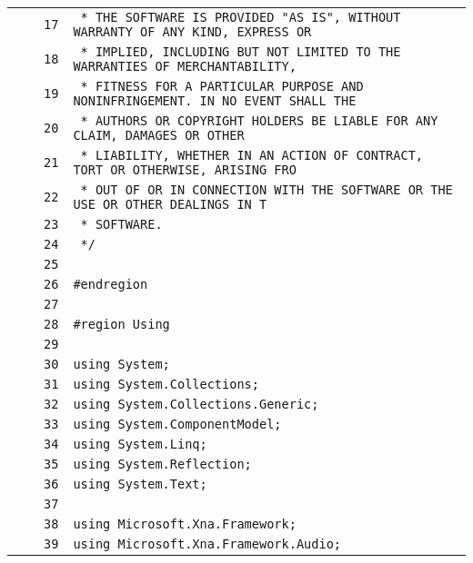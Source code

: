 \documentclass[a4paper,10pt]{article}
\begin{document}
\begin{longtable}[l]{lrrl}
\cellcolor{gray} &  & \verb~17~ & \verb~ * THE SOFTWARE IS PROVIDED "AS IS", WITHOUT WARRANTY OF ANY KIND, EXPRESS OR~\\
\cellcolor{gray} &  & \verb~18~ & \verb~ * IMPLIED, INCLUDING BUT NOT LIMITED TO THE WARRANTIES OF MERCHANTABILITY,~\\
\cellcolor{gray} &  & \verb~19~ & \verb~ * FITNESS FOR A PARTICULAR PURPOSE AND NONINFRINGEMENT. IN NO EVENT SHALL THE~\\
\cellcolor{gray} &  & \verb~20~ & \verb~ * AUTHORS OR COPYRIGHT HOLDERS BE LIABLE FOR ANY CLAIM, DAMAGES OR OTHER~\\
\cellcolor{gray} &  & \verb~21~ & \verb~ * LIABILITY, WHETHER IN AN ACTION OF CONTRACT, TORT OR OTHERWISE, ARISING FRO~\\
\cellcolor{gray} &  & \verb~22~ & \verb~ * OUT OF OR IN CONNECTION WITH THE SOFTWARE OR THE USE OR OTHER DEALINGS IN T~\\
\cellcolor{gray} &  & \verb~23~ & \verb~ * SOFTWARE.~\\
\cellcolor{gray} &  & \verb~24~ & \verb~ */~\\
\cellcolor{gray} &  & \verb~25~ & \verb~~\\
\cellcolor{gray} &  & \verb~26~ & \verb~#endregion~\\
\cellcolor{gray} &  & \verb~27~ & \verb~~\\
\cellcolor{gray} &  & \verb~28~ & \verb~#region Using~\\
\cellcolor{gray} &  & \verb~29~ & \verb~~\\
\cellcolor{gray} &  & \verb~30~ & \verb~using System;~\\
\cellcolor{gray} &  & \verb~31~ & \verb~using System.Collections;~\\
\cellcolor{gray} &  & \verb~32~ & \verb~using System.Collections.Generic;~\\
\cellcolor{gray} &  & \verb~33~ & \verb~using System.ComponentModel;~\\
\cellcolor{gray} &  & \verb~34~ & \verb~using System.Linq;~\\
\cellcolor{gray} &  & \verb~35~ & \verb~using System.Reflection;~\\
\cellcolor{gray} &  & \verb~36~ & \verb~using System.Text;~\\
\cellcolor{gray} &  & \verb~37~ & \verb~~\\
\cellcolor{gray} &  & \verb~38~ & \verb~using Microsoft.Xna.Framework;~\\
\cellcolor{gray} &  & \verb~39~ & \verb~using Microsoft.Xna.Framework.Audio;~\\

\end{longtable}
\end{document}
